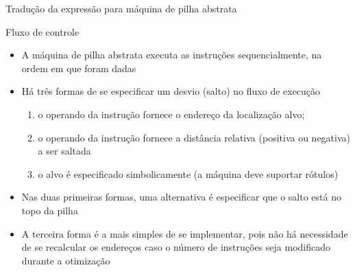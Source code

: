 \begin{frame}[fragile]{Tradução da expressão  para máquina de pilha abstrata}
\end{frame}

\begin{frame}[fragile]{Fluxo de controle}

    \begin{itemize}
        \item A máquina de pilha abstrata executa as instruções sequencialmente, na ordem em que foram dadas
        \pause

        \item Há três formas de se especificar um desvio (salto) no fluxo de execução
        \pause
        \begin{enumerate}
            \item o operando da instrução fornece o endereço da localização alvo;
            \pause 

            \item o operando da instrução fornece a distância relativa (positiva ou negativa) a ser saltada
            \pause

            \item o alvo é especificado simbolicamente (a máquina deve suportar rótulos)
            \pause
        \end{enumerate}

        \item Nas duas primeiras formas, uma alternativa é especificar que o salto está no topo da pilha
        \pause

        \item A terceira forma é a mais simples de se implementar, pois não há necessidade de se recalcular os endereços caso o número de instruções seja
            modificado durante a otimização
    \end{itemize}

\end{frame}

